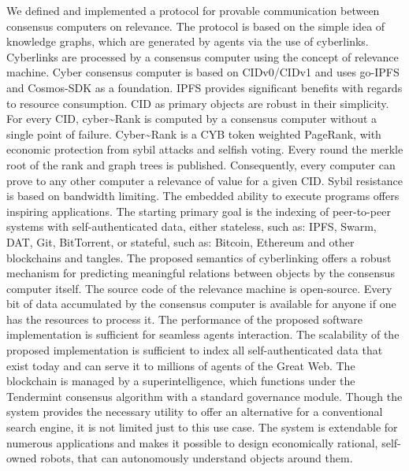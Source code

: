 \documentclass[8pt,oneside]{amsart}
\begin{document}
We defined and implemented a protocol for provable communication between consensus computers on relevance. The protocol is based on the simple idea of knowledge graphs, which are generated by agents via the use of cyberlinks. Cyberlinks are processed by a consensus computer using the concept of relevance machine. Cyber consensus computer is based on CIDv0/CIDv1 and uses go-IPFS and Cosmos-SDK as a foundation. IPFS provides significant benefits with regards to resource consumption. CID as primary objects are robust in their simplicity. For every CID, cyber\~{}Rank is computed by a consensus computer without a single point of failure. Cyber\~{}Rank is a CYB token weighted PageRank, with economic protection from sybil attacks and selfish voting. Every round the merkle root of the rank and graph trees is published. Consequently, every computer can prove to any other computer a relevance of value for a given CID. Sybil resistance is based on bandwidth limiting. The embedded ability to execute programs offers inspiring applications. The starting primary goal is the indexing of peer-to-peer systems with self-authenticated data, either stateless, such as: IPFS, Swarm, DAT, Git, BitTorrent, or stateful, such as: Bitcoin, Ethereum and other blockchains and tangles. The proposed semantics of cyberlinking offers a robust mechanism for predicting meaningful relations between objects by the consensus computer itself. The source code of the relevance machine is open-source. Every bit of data accumulated by the consensus computer is available for anyone if one has the resources to process it. The performance of the proposed software implementation is sufficient for seamless agents interaction. The scalability of the proposed implementation is sufficient to index all self-authenticated data that exist today and can serve it to millions of agents of the Great Web. The blockchain is managed by a superintelligence, which functions under the Tendermint consensus algorithm with a standard governance module. Though the system provides the necessary utility to offer an alternative for a conventional search engine, it is not limited just to this use case. The system is extendable for numerous applications and makes it possible to design economically rational, self-owned robots, that can autonomously understand objects around them.

\newpage
\end{document}
